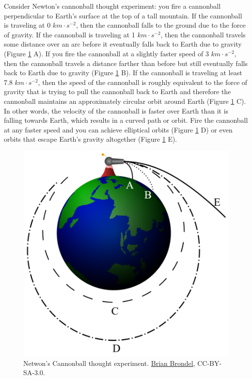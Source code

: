 \documentclass[
]{book}
\begin{document}
Consider Newton's cannonball thought experiment: you fire a cannonball perpendicular to Earth's surface at the top of a tall mountain. If the cannonball is traveling at 0 \(km·s^{-2}\), then the cannonball falls to the ground due to the force of gravity. If the cannonball is traveling at 1 \(km·s^{-2}\), then the cannonball travels some distance over an arc before it eventually falls back to Earth due to gravity (Figure \ref{fig:12-newtons-cannonball} A). If you fire the cannonball at a slightly faster speed of 3 \(km·s^{-2}\), then the cannonball travels a distance farther than before but still eventually falls back to Earth due to gravity (Figure \ref{fig:12-newtons-cannonball} B). If the cannonball is traveling at least 7.8 \(km·s^{-2}\), then the speed of the cannonball is roughly equivalent to the force of gravity that is trying to pull the cannonball back to Earth and therefore the cannonball maintains an approximately circular orbit around Earth (Figure \ref{fig:12-newtons-cannonball} C). In other words, the velocity of the cannonball is faster over Earth than it is falling towards Earth, which results in a curved path or orbit. Fire the cannonball at any faster speed and you can achieve elliptical orbits (Figure \ref{fig:12-newtons-cannonball} D) or even orbits that escape Earth's gravity altogether (Figure \ref{fig:12-newtons-cannonball} E).



\begin{figure}
\includegraphics[width=0.75\linewidth]{images/12-newtons-cannonball} \caption{Netwon's Cannonball thought experiment. \href{https://upload.wikimedia.org/wikipedia/commons/archive/7/73/20070210061321\%21Newton_Cannon.svg}{Brian Brondel}, CC-BY-SA-3.0.}\label{fig:12-newtons-cannonball}
\end{figure}
\end{document}

